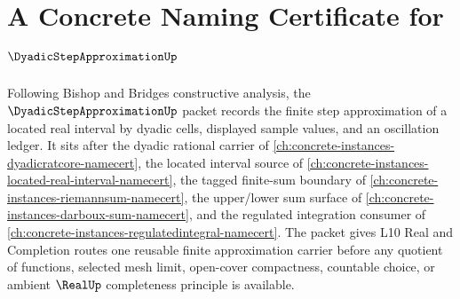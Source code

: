 \chapter{A Concrete Naming Certificate for $\DyadicStepApproximationUp$}
\label{ch:concrete-instances-dyadic-step-approximation-namecert}

Following Bishop and Bridges constructive analysis, the $\DyadicStepApproximationUp$ packet records the finite step approximation of a located real interval by dyadic cells, displayed sample values, and an oscillation ledger. It sits after the dyadic rational carrier of \autoref{ch:concrete-instances-dyadicratcore-namecert}, the located interval source of \autoref{ch:concrete-instances-located-real-interval-namecert}, the tagged finite-sum boundary of \autoref{ch:concrete-instances-riemannsum-namecert}, the upper/lower sum surface of \autoref{ch:concrete-instances-darboux-sum-namecert}, and the regulated integration consumer of \autoref{ch:concrete-instances-regulatedintegral-namecert}. The packet gives L10 Real and Completion routes one reusable finite approximation carrier before any quotient of functions, selected mesh limit, open-cover compactness, countable choice, or ambient $\RealUp$ completeness principle is available.

